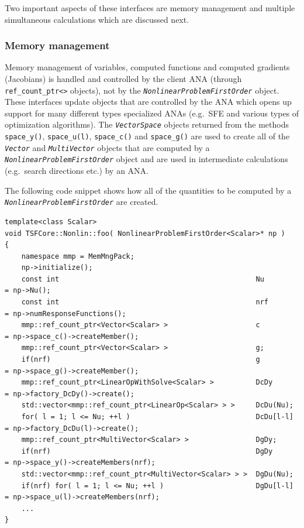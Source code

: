 Two important aspects of these interfaces are memory management and
multiple simultaneous calculations which are discussed next.

%
\subsubsection{Memory management}
%

Memory management of variables, computed functions and computed
gradients (Jacobians) is handled and controlled by the client ANA
(through \texttt{ref\_count\_ptr<>} objects), not by the
\texttt{\textit{Nonlinear\-Problem\-First\-Order}} object.  These
interfaces update objects that are controlled by the ANA which opens up
support for many different types specialized ANAs (e.g.~SFE
\cite{ref:sfe} and various types of optimization algorithms).  The
\texttt{\textit{Vector\-Space}} objects returned from the methods
\texttt{space\_y()}, \texttt{space\_u(l)}, \texttt{space\_c()} and
\texttt{space\_g()} are used to create all of the \texttt{\textit{Vector}}
and \texttt{\textit{Multi\-Vector}} objects that are computed by a
\texttt{\textit{Nonlinear\-Problem\-First\-Order}} object and
are used in intermediate calculations (e.g.~search directions etc.) by
an ANA.

The following code snippet shows how all of the quantities to be
computed by a \texttt{\textit{Nonlinear\-Problem\-First\-Order}}
are created.

{\scriptsize\begin{verbatim}
template<class Scalar>
void TSFCore::Nonlin::foo( NonlinearProblemFirstOrder<Scalar>* np )
{
    namespace mmp = MemMngPack;
    np->initialize();
    const int                                               Nu        = np->Nu();
    const int                                               nrf       = np->numResponseFunctions();
    mmp::ref_count_ptr<Vector<Scalar> >                     c         = np->space_c()->createMember();
    mmp::ref_count_ptr<Vector<Scalar> >                     g;
    if(nrf)                                                 g         = np->space_g()->createMember();
    mmp::ref_count_ptr<LinearOpWithSolve<Scalar> >          DcDy      = np->factory_DcDy()->create();
    std::vector<mmp::ref_count_ptr<LinearOp<Scalar> > >     DcDu(Nu);
    for( l = 1; l <= Nu; ++l )                              DcDu[l-l] = np->factory_DcDu(l)->create();
    mmp::ref_count_ptr<MultiVector<Scalar> >                DgDy;
    if(nrf)                                                 DgDy      = np->space_y()->createMembers(nrf);
    std::vector<mmp::ref_count_ptr<MultiVector<Scalar> > >  DgDu(Nu);
    if(nrf) for( l = 1; l <= Nu; ++l )                      DgDu[l-l] = np->space_u(l)->createMembers(nrf);
    ...
}
\end{verbatim}}

